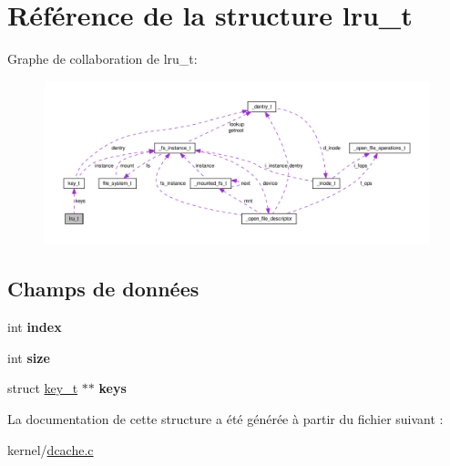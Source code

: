 \hypertarget{structlru__t}{\section{Référence de la structure lru\-\_\-t}
\label{structlru__t}
}


Graphe de collaboration de lru\-\_\-t\-:\nopagebreak
\begin{figure}[H]
\begin{center}
\leavevmode
\includegraphics[width=350pt]{structlru__t__coll__graph}
\end{center}
\end{figure}
\subsection*{Champs de données}
\begin{DoxyCompactItemize}
\item 
\hypertarget{structlru__t_acf3186bcc787c56bcd638b109f8072ff}{int {\bfseries index}}\label{structlru__t_acf3186bcc787c56bcd638b109f8072ff}

\item 
\hypertarget{structlru__t_a299ea859f14004fb313cdb0242ae67e8}{int {\bfseries size}}\label{structlru__t_a299ea859f14004fb313cdb0242ae67e8}

\item 
\hypertarget{structlru__t_a268635bc2b2a850faf194cd4fcc5ff57}{struct \hyperlink{structkey__t}{key\-\_\-t} $\ast$$\ast$ {\bfseries keys}}\label{structlru__t_a268635bc2b2a850faf194cd4fcc5ff57}

\end{DoxyCompactItemize}


La documentation de cette structure a été générée à partir du fichier suivant \-:\begin{DoxyCompactItemize}
\item 
kernel/\hyperlink{dcache_8c}{dcache.\-c}\end{DoxyCompactItemize}
